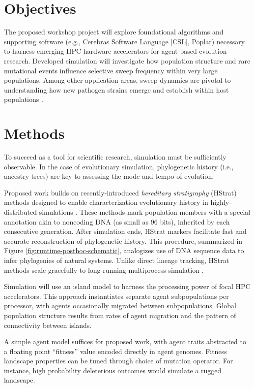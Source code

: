 \section{Objectives}

The proposed workshop project will explore foundational algorithms and supporting software (e.g., Cerebras Software Language [CSL], Poplar) necessary to harness emerging HPC hardware accelerators for agent-based evolution research.
Developed simulation will investigate how population structure and rare mutational events influence selective sweep frequency within very large populations.
Among other application areas, sweep dynamics are pivotal to understanding how new pathogen strains emerge and establish within host populations \cite{markov2023evolution}.

\section{Methods}

To succeed as a tool for scientific research, simulation must be sufficiently observable.
In the case of evolutionary simulation, phylogenetic history (i.e., ancestry trees) are key to assessing the mode and tempo of evolution.



Proposed work builds on recently-introduced \textit{hereditary stratigraphy} (HStrat) methods designed to enable characterization evolutionary history in highly-distributed simulations \cite{moreno2022hstrat}.
These methods mark population members with a special annotation akin to noncoding DNA (as small as 96 bits), inherited by each consecutive generation.
After simulation ends, HStrat markers facilitate fast and accurate reconstruction of phylogenetic history.
This procedure, summarized in Figure \ref{fig:runtime-posthoc-schematic}, analogizes use of DNA sequence data to infer phylogenies of natural systems.
Unlike direct lineage tracking, HStrat methods scale gracefully to long-running multiprocess simulation \cite{moreno2024analysis}.

Simulation will use an island model to harness the processing power of focal HPC accelerators.
This approach instantiates separate agent subpopulations per processor, with agents occasionally migrated between subpopulations.
Global population structure results from rates of agent migration and the pattern of connectivity between islands.

A simple agent model suffices for proposed work, with agent traits abstracted to a floating point ``fitness'' value encoded directly in agent genomes.
Fitness landscape properties can be tuned through choice of mutation operator.
For instance, high probability deleterious outcomes would simulate a rugged landscape.

